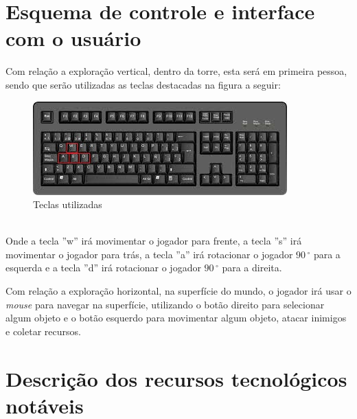 \documentclass[11pt]{article} %
\begin{document}
\section*{Esquema de controle e interface com o usuário}
Com relação a exploração vertical, dentro da torre, esta será em primeira pessoa, sendo que serão utilizadas as teclas destacadas na figura a seguir:\\
\begin{figure}[!htp]
\centering
\includegraphics[scale=0.75]{imagens/teclado.jpg}
\caption{Teclas utilizadas}
\label{Teclado}
\end{figure}
\\Onde a tecla ''w'' irá movimentar o jogador para frente, a tecla ''s'' irá movimentar o jogador para trás, a tecla ''a'' irá rotacionar o jogador $90\,^{\circ}$ para a esquerda e a tecla ''d'' irá rotacionar o jogador $90\,^{\circ}$ para a direita.

Com relação a exploração horizontal, na superfície do mundo, o jogador irá usar o \textit{mouse} para navegar na superfície, utilizando o botão direito para selecionar algum objeto e o botão esquerdo para movimentar algum objeto, atacar inimigos e coletar recursos. 
\section*{Descrição dos recursos tecnológicos notáveis}
\end{document}
